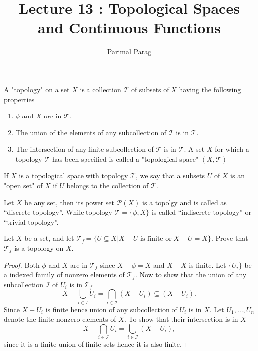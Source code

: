 \documentclass[a4paper,english,12pt]{article}   	%
\title{Lecture 13 : Topological Spaces and Continuous Functions}
\author{Parimal Parag}
\date{}							%
\begin{document}
\maketitle
\section{}
\begin{defn}[Topology] A "topology" on a set $X$ is a collection $\mathcal{T}$ of subsets of $X$ having the following properties
\begin{enumerate}
\item $\phi$ and $X$ are in $\mathcal{T}$.
\item The union of the elements of any subcollection of $\mathcal{T}$ is in $\mathcal{T}$.
\item The intersection of any finite subcollection of $\mathcal{T}$ is in $\mathcal{T}$. A set $X$ for which a topology $\mathcal{T}$ has been specified is called a "topological space" $(X,\mathcal{T})$
\end{enumerate}
\end{defn}
\begin{defn} If $X$ is a topological space with topology $\mathcal{T}$, we say that a subsets $U$ of $X$ is an "open set" of $X$ if $U$ belongs to the collection of $\mathcal{T}$.
\end{defn}
\begin{exmp} 
 Let $X$ be any set, then its power set $\mathcal{P}(X)$ is a topolgy and is called as ``discrete topology''.  While topology $\mathcal{T} =\{\phi,X\}$ is called ``indiscrete topology'' or ``trivial topology''.
\end{exmp}
\begin{exmp} 
 Let $X$ be a set, and let $\mathcal{T}_f = \{U\subseteq X|X-U\text{ is finite or }X-U=X\}$. Prove that $\mathcal{T}_f$ is a topology on $X$.
 \begin{proof}
  Both $\phi$ and $X$ are in $\mathcal{T}_f$ since $X-\phi =X$ and $X-X$ is finite. Let $\{U_i\}$ be a indexed family of nonzero elements of $\mathcal{T}_f$. Now to show that the union of any subcollection $\mathcal{I}$ of $U_i$ is in $\mathcal{T}_f$ $$X-\bigcup_{i\in\mathcal{I}}U_i=\bigcap_{i\in\mathcal{I}}(X-U_i)\subseteq (X-U_i).$$ Since $X-U_i$ is finite hence union of any subcollection of $U_i$ is in $X$. Let $U_1,\ldots,U_n$ denote the finite nonzero elements of $X$. To show that their intersection is in $X$ $$X-\bigcap_{i\in\mathcal{I}}U_i=\bigcup_{i\in\mathcal{I}}(X-U_i),$$
  since it is a finite union of finite sets hence it is also finite. 
 \end{proof}
 \end{exmp}
 
\end{document}
